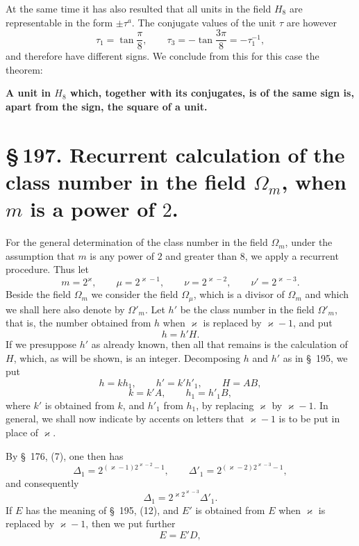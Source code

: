 \documentclass[11pt]{article}
\begin{document}
At the same time it has also resulted that all units in the field $H_8$ are representable in the form $\pm\tau^a$. The conjugate values of the unit $\tau$ are however
\[
\tau_1=\tan\frac\pi8,\qquad
\tau_3=-\tan\frac{3\pi}{8}=-\tau_1^{-1},
\]
and therefore have different signs. We conclude from this for this case the theorem:
\begin{center}
\textbf{A unit in $H_8$ which, together with its conjugates, is of the same sign is, apart from the sign, the square of a unit.}
\end{center}

\section*{\S\,197. Recurrent calculation of the class number in the field $\Omega_m$, when $m$ is a power of $2$.}

For the general determination of the class number in the field $\Omega_m$, under the assumption that $m$ is any power of $2$ and greater than $8$, we apply a recurrent procedure. Thus let
\begin{equation}
m=2^\varkappa,
\qquad
\mu=2^{\varkappa-1},
\qquad
\nu=2^{\varkappa-2},
\qquad
\nu'=2^{\varkappa-3}.
\tag{1}
\end{equation}
Beside the field $\Omega_m$ we consider the field $\Omega_\mu$, which is a divisor of $\Omega_m$ and which we shall here also denote by $\Omega'_m$. Let $h'$ be the class number in the field $\Omega'_m$, that is, the number obtained from $h$ when $\varkappa$ is replaced by $\varkappa-1$, and put
\begin{equation}
h=h'H.
\tag{2}
\end{equation}
If we presuppose $h'$ as already known, then all that remains is the calculation of $H$, which, as will be shown, is an integer. Decomposing $h$ and $h'$ as in \S~195, we put
\begin{equation}
h=kh_1,
\qquad
h'=k'h'_1,
\qquad
H=AB,
\tag{3}
\end{equation}
\begin{equation}
k=k'A,
\qquad
h_1=h'_1B,
\tag{4}
\end{equation}
where $k'$ is obtained from $k$, and $h'_1$ from $h_1$, by replacing $\varkappa$ by $\varkappa-1$. In general, we shall now indicate by accents on letters that $\varkappa-1$ is to be put in place of $\varkappa$.

By \S~176, (7), one then has
\[
\Delta_1=2^{(\varkappa-1)2^{\varkappa-2}-1},
\qquad
\Delta'_1=2^{(\varkappa-2)2^{\varkappa-3}-1},
\]
and consequently
\begin{equation}
\Delta_1=2^{\varkappa2^{\varkappa-3}}\Delta'_1.
\tag{5}
\end{equation}
If $E$ has the meaning of \S~195, (12), and $E'$ is obtained from $E$ when $\varkappa$ is replaced by $\varkappa-1$, then we put further
\begin{equation}
E=E'D,
\tag{6}
\end{equation}
\end{document}
